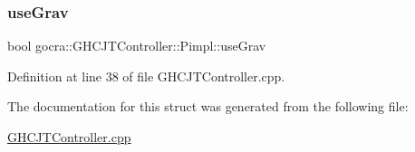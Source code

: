 \hypertarget{structgocra_1_1GHCJTController_1_1Pimpl_a0a9b1d16fc029929004e00dbf358063a}{}\label{structgocra_1_1GHCJTController_1_1Pimpl_a0a9b1d16fc029929004e00dbf358063a} 
\subsubsection{\texorpdfstring{use\+Grav}{useGrav}}
{\footnotesize\ttfamily bool gocra\+::\+G\+H\+C\+J\+T\+Controller\+::\+Pimpl\+::use\+Grav}



Definition at line 38 of file G\+H\+C\+J\+T\+Controller.\+cpp.



The documentation for this struct was generated from the following file\+:\begin{DoxyCompactItemize}
\item 
\hyperlink{GHCJTController_8cpp}{G\+H\+C\+J\+T\+Controller.\+cpp}\end{DoxyCompactItemize}
